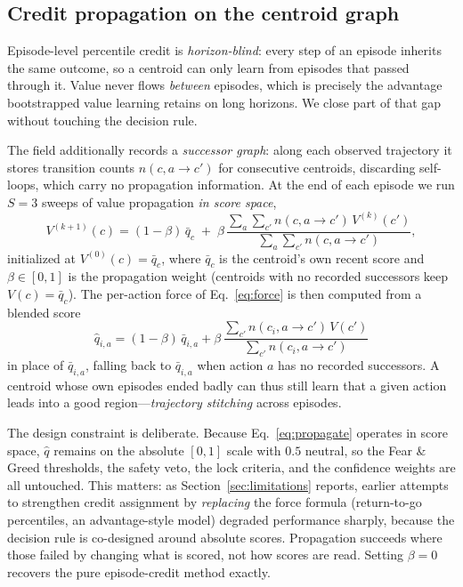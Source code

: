 \documentclass[11pt]{article}
\begin{document}
\subsection{Credit propagation on the centroid graph}
\label{sec:propagation}
Episode-level percentile credit is \emph{horizon-blind}: every step of an
episode inherits the same outcome, so a centroid can only learn from episodes
that passed through it. Value never flows \emph{between} episodes, which is
precisely the advantage bootstrapped value learning retains on long horizons.
We close part of that gap without touching the decision rule.

The field additionally records a \emph{successor graph}: along each observed
trajectory it stores transition counts
$n(c,a\!\to\!c')$ for consecutive centroids, discarding self-loops, which
carry no propagation information. At the end of each episode we run $S=3$
sweeps of value propagation \emph{in score space},
\begin{equation}
V^{(k+1)}(c)=(1-\beta)\,\bar q_c
\;+\;\beta\,
\frac{\sum_{a}\sum_{c'} n(c,a\!\to\!c')\,V^{(k)}(c')}
     {\sum_{a}\sum_{c'} n(c,a\!\to\!c')},
\label{eq:propagate}
\end{equation}
initialized at $V^{(0)}(c)=\bar q_c$, where $\bar q_c$ is the centroid's own
recent score and $\beta\in[0,1]$ is the propagation weight (centroids with no
recorded successors keep $V(c)=\bar q_c$). The per-action force of
Eq.~\eqref{eq:force} is then computed from a blended score
\begin{equation}
\hat q_{i,a}=(1-\beta)\,\bar q_{i,a}+\beta\,
\frac{\sum_{c'} n(c_i,a\!\to\!c')\,V(c')}{\sum_{c'} n(c_i,a\!\to\!c')}
\label{eq:blendedscore}
\end{equation}
in place of $\bar q_{i,a}$, falling back to $\bar q_{i,a}$ when action $a$ has
no recorded successors. A centroid whose own episodes ended badly can thus still
learn that a given action leads into a good region---\emph{trajectory
stitching} across episodes.

The design constraint is deliberate. Because Eq.~\eqref{eq:propagate} operates
in score space, $\hat q$ remains on the absolute $[0,1]$ scale with $0.5$
neutral, so the Fear \& Greed thresholds, the safety veto, the lock criteria,
and the confidence weights are all untouched. This matters: as
Section~\ref{sec:limitations} reports, earlier attempts to strengthen credit
assignment by \emph{replacing} the force formula (return-to-go percentiles, an
advantage-style model) degraded performance sharply, because the decision rule
is co-designed around absolute scores. Propagation succeeds where those failed
by changing what is scored, not how scores are read. Setting $\beta=0$ recovers
the pure episode-credit method exactly.
\end{document}
